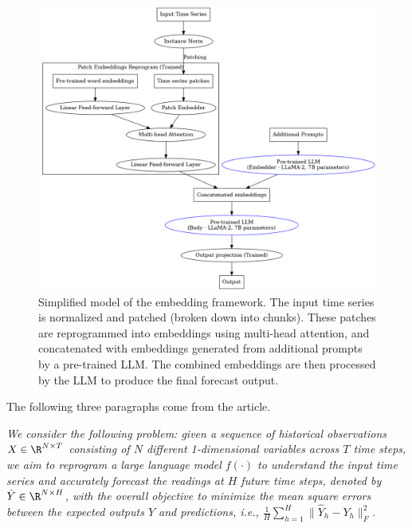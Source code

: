 \begin{figure}[h!]
	\centering
	\includegraphics[width=0.8\linewidth]{"pictures/graph.png"}
	\caption{Simplified model of the embedding framework.
		The input time series is normalized and patched (broken down into chunks). These patches are reprogrammed into embeddings using multi-head attention,
		and concatenated with embeddings generated from additional prompts by a pre-trained LLM.
		The combined embeddings are then processed by the LLM to produce the final forecast output. }

	\label{fig:prompt_embedding_fig}
\end{figure}



The following three paragraphs come from the article.\cite{reprogramming_llm}

\textit{We consider the following problem: given a sequence of historical observations \(X \in \R^{N\times T}\)
	consisting of \(N\) different 1-dimensional variables across \(T\) time steps, we aim to reprogram a large
	language model \(f(\cdot)\) to understand the input time series and accurately forecast the readings at \(H\) future time steps, denoted by \(\hat{Y} \in \R^{N\times H}\), with the overall objective to minimize the mean square errors between the expected outputs \(Y\) and predictions, i.e., \(\frac1H \sum_{h=1}^H \| \hat{Y}_h - Y_h \|_F^2 \).}

